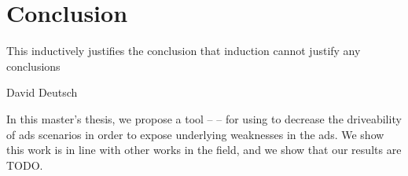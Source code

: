 \chapter{Conclusion}

\epigraph{This inductively justifies the conclusion that induction cannot justify any conclusions}{David Deutsch}

In this master's thesis, we propose a tool -- \hefe -- for using  to decrease the
driveability of \acrfull{ads} scenarios in order to expose underlying weaknesses in the
\acrshort{ads}. We show this work is in line with other works in the field, and we show that our
results are TODO.
